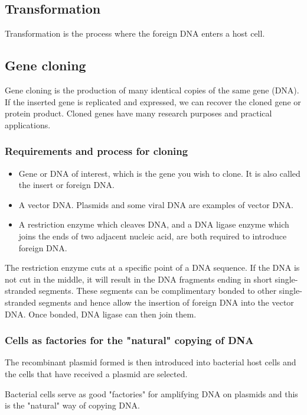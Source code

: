 \documentclass[11pt]{article}
\begin{document}
\subsection{Transformation}
\label{sec:org60b9303}
Transformation is the process where the foreign DNA enters a host cell.

\newpage
\subsection{Gene cloning}
\label{sec:org34596a3}
Gene cloning is the production of many identical copies of the same gene (DNA). If the inserted gene is replicated and expressed, we can recover the cloned gene or protein product. Cloned genes have many research purposes and practical applications.
\subsubsection{Requirements and process for cloning}
\label{sec:orge59a3aa}
\begin{itemize}
\item Gene or DNA of interest, which is the gene you wish to clone. It is also called the insert or foreign DNA.
\item A vector DNA. Plasmids and some viral DNA are examples of vector DNA.
\item A restriction enzyme which cleaves DNA, and a DNA ligase enzyme which joins the ends of two adjacent nucleic acid, are both required to introduce foreign DNA.
\end{itemize}

The restriction enzyme cuts at a specific point of a DNA sequence. If the DNA is not cut in the middle, it will result in the DNA fragments ending in short single-stranded segments. These segments can be complimentary bonded to other single-stranded segments and hence allow the insertion of foreign DNA into the vector DNA. Once bonded, DNA ligase can then join them.
\subsubsection{Cells as factories for the "natural" copying of DNA}
\label{sec:orgf1637f3}
The recombinant plasmid formed is then introduced into bacterial host cells and the cells that have received a plasmid are selected.


Bacterial cells serve as good "factories" for amplifying DNA on plasmids and this is the "natural" way of copying DNA.
\end{document}
